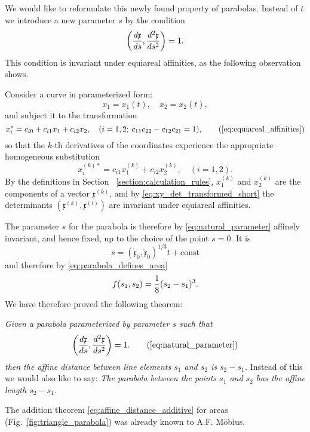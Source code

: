 \documentclass[11pt]{book} \usepackage{amssymb}
\newcommand{\myvec}[1]{\mathfrak{#1}}
\begin{document}
We would like to reformulate this newly found property of parabolas. Instead of
$t$ we introduce a new parameter $s$ by the condition
\begin{equation}
  \label{eq:natural_parameter}
  \left({d\myvec{x}\over ds},{d^2\myvec{x}\over ds^2}\right)=1.
\end{equation}
This condition is invariant under equiareal affinities, as the following 
observation shows.

Consider a curve in parameterized form:
\begin{equation}
  \label{eq:parameterized_curve}
  x_1=x_1(t),\quad x_2=x_2(t),
\end{equation}
and subject it to the transformation 
\begin{equation*}
  x_i^*=c_{i0}+c_{i1}x_1+c_{i2}x_2,\quad (i=1,2;\: c_{11}c_{22}-c_{12}c_{21}=1),
  \tag{\ref{eq:equiareal_affinities}}
\end{equation*}
so that the $k$-th derivatives of the coordinates experience the appropriate
homogeneous substitution
\begin{equation}
  \label{eq:deriv_transform}
  x_i^{(k)*}=c_{i1}x_1^{(k)}+c_{i2}x_2^{(k)}, \quad (i=1,2).
\end{equation}
By the definitions in Section ~\ref{section:calculation_rules}, $x_1^{(k)}$ and
$x_2^{(k)}$ are the components of a vector $\myvec{x}^{(k)}$, and by 
\eqref{eq:xy_det_transformed_short} the determinants 
$(\myvec{x}^{(k)},\myvec{x}^{(l)})$ are invariant under equiareal affinities.

The parameter $s$ for the parabola is therefore by \eqref{eq:natural_parameter}
affinely invariant, and hence fixed, up to the choice of the point $s=0$. It
is
\begin{equation*}
  s=(\dot{\myvec{x}}_0,\ddot{\myvec{x}}_0)^{1/3}t+\mbox{const}
\end{equation*}
and therefore by \eqref{eq:parabola_defines_area}
\begin{equation}
  \label{eq:area_by_natural_param}
  f(s_1,s_2)={1\over 8}(s_2-s_1)^3.
\end{equation}
We have therefore proved the following theorem:

{\em Given a parabola parameterized by parameter $s$ such that
  \begin{equation}
    \left({d\myvec{x}\over ds},{d^2\myvec{x}\over ds^2}\right)=1.
    \tag{\ref{eq:natural_parameter}}
  \end{equation}
  then the affine distance between line elements $s_1$ and $s_2$ is $s_2-s_1$.}
Instead of this we would also like to say: {\em The parabola between the points
$s_1$ and $s_2$ has the affine length $s_2-s_1$.}

The addition theorem \eqref{eq:affine_distance_additive} for areas 
(Fig.~\ref{fig:triangle_parabola}) was already known to A.F. M\"obius.
 
\end{document}
